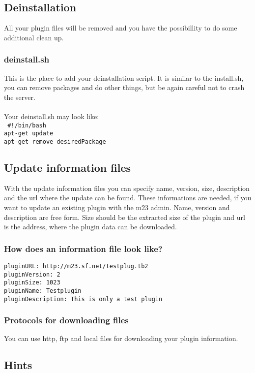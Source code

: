 \subsection{Deinstallation}
All your plugin files will be removed and you have the possibillity to do some additional clean up.

\subsubsection{deinstall.sh}
This is the place to add your deinstallation script. It is similar to the install.sh, you can remove packages and do other things, but be again careful not to crash the server.\\\\
Your deinstall.sh may look like:\\
\texttt{
\#!/bin/bash \\
apt-get update\\
apt-get remove desiredPackage}

\subsection{Update information files}
With the update information files you can specify name, version, size, description and the url where the update can be found. These informations are needed, if you want to update an existing plugin with the m23 admin. Name, version and description are free form. Size should be the extracted size of the plugin and url is the address, where the plugin data can be downloaded.
\subsubsection{How does an information file look like?}
\begin{verbatim}
pluginURL: http://m23.sf.net/testplug.tb2
pluginVersion: 2
pluginSize: 1023
pluginName: Testplugin
pluginDescription: This is only a test plugin
\end{verbatim} 

\subsubsection{Protocols for downloading files}
You can use http, ftp and local files for downloading your plugin information.

\subsection{Hints}
